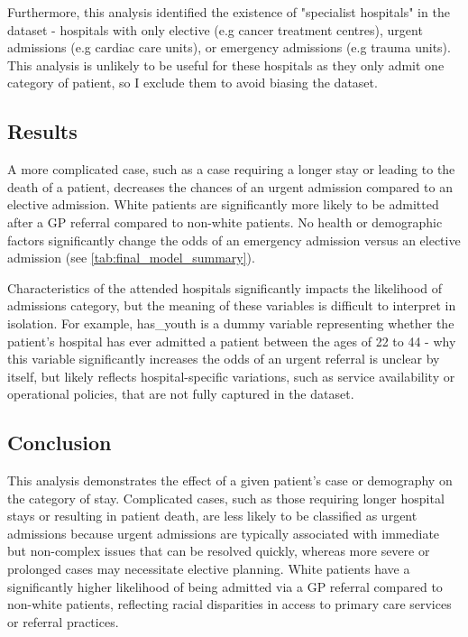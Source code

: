 \documentclass[11pt]{article}
\begin{document}
Furthermore, this analysis identified the existence of "specialist hospitals" in the dataset - hospitals with only elective (e.g cancer treatment centres), urgent admissions (e.g cardiac care units), or emergency admissions (e.g trauma units). This analysis is unlikely to be useful for these hospitals as they only admit one category of patient, so I exclude them to avoid biasing the dataset.

\vspace{-0.5cm}
\subsection*{
    \vspace{-0.25cm}
    Results
}
A more complicated case, such as a case requiring a longer stay or leading to the death of a patient, decreases the chances of an urgent admission compared to an elective admission. White patients are significantly more likely to be admitted after a GP referral compared to non-white patients. No health or demographic factors significantly change the odds of an emergency admission versus an elective admission (see \ref{tab:final_model_summary}).

Characteristics of the attended hospitals significantly impacts the likelihood of admissions category, but the meaning of these variables is difficult to interpret in isolation.  For example, has\_youth is a dummy variable representing whether the patient's hospital has ever admitted a patient between the ages of 22 to 44 - why this variable significantly increases the odds of an urgent referral is unclear by itself, but likely reflects hospital-specific variations, such as service availability or operational policies, that are not fully captured in the dataset.

\vspace{-0.5cm}
\subsection*{
    \vspace{-0.25cm}
    Conclusion
}

This analysis demonstrates the effect of a given patient's case or demography on the category of stay. Complicated cases, such as those requiring longer hospital stays or resulting in patient death, are less likely to be classified as urgent admissions because urgent admissions are typically associated with immediate but non-complex issues that can be resolved quickly, whereas more severe or prolonged cases may necessitate elective planning. White patients have a significantly higher likelihood of being admitted via a GP referral compared to non-white patients, reflecting racial disparities in access to primary care services or referral practices.
\end{document}
